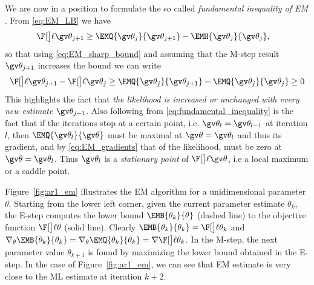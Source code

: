 We are now in a position to formulate the so called \emph{fundamental inequality of EM} \parencite{Cappe2005}.
From \eqref{eq:EM_LB} we have
\begin{align*}
	\lLH[\Th_{j+1}] & \geq \EMQ{\Th_j}{\Th_{j+1}} - \EMH{\Th_j}{\Th_{j}},
\end{align*}
so that using \eqref{eq:EM_sharp_bound} and assuming that the M-step result $\Th_{j+1}$ increases
the bound we can write
\begin{align}
\label{eq:fundamental_inequality}	
\begin{split}	
	\lLH[\Th_{j+1}] - \lLH[\Th_j] & \geq \EMQ{\Th_j}{\Th_{j+1}} - \EMQ{\Th_j}{\Th_{j}} \geq 0\\
\end{split}
\end{align}
This highlights
the fact that \emph{the likelihood is increased or unchanged with every new estimate} $\Th_{j+1}$.
Also following from \eqref{eq:fundamental_inequality} is the fact that if the iterations
stop at a certain point, i.e. $\Th_{l}=\Th_{l-1}$ at iteration $l$, then
$\EMQ{\Th_l}{\Th}$ must be maximal at $\Th=\Th_l$ and thus its gradient, and 
by \eqref{eq:EM_gradients} that of the likelihood, must be zero at $\Th=\Th_l$. Thus
$\Th_l$ is a \emph{stationary point} of $\lLH$, i.e a local maximum or a saddle point.

Figure~\ref{fig:ar1_em} illustrates the EM algorithm for a unidimensional parameter 
$\theta$. Starting from the lower left corner, given the current parameter estimate
$\theta_k$, the E-step computes the lower bound $\EMB{\theta_k}{\theta}$ (dashed line) 
to the objective function $\lLH[\theta]$ (solid line). Clearly $\EMB{\theta_k}{\theta_k}=\lLH[\theta_k]$
and $\nabla_{\theta}\EMB{\theta_k}{\theta_k}=\nabla_{\theta}\EMQ{\theta_k}{\theta_k}=\score[\theta_k]$.
In the M-step, the next parameter value $\theta_{k+1}$ is found by maximizing the lower bound obtained
in the E-step. In the case of Figure~\ref{fig:ar1_em}, we can see that EM estimate is very close
to the ML estimate at iteration $k+2$. 

